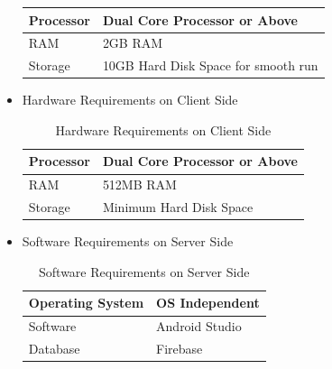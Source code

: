 \documentclass{article}
\begin{document}
\begin{flushleft}
\begin{itemize}
\begin{center}
\begin{table}[!ht]
\begin{tabular}{ | m{5em} | m{7cm} | }
            \hline
             Processor & Dual Core Processor or Above  \\ \hline
             RAM & 2GB RAM   \\  \hline
             Storage & 10GB Hard Disk Space for smooth run  \\  \hline
            \end{tabular}
            
           \end{table}
            
            \end{center}
            
            
          \item Hardware Requirements on Client Side 
          \begin{center}
          \begin{table}[!ht]
          \renewcommand\thetable{1.5.2}
              \centering
              \caption{Hardware Requirements on Client Side}
              \label{ }
             \begin{tabular}{ | m{5em} | m{7cm} | }
           
            \hline
             Processor & Dual Core Processor or Above  \\ \hline
             RAM & 512MB RAM   \\  \hline
             Storage & Minimum Hard Disk Space  \\  \hline
            \end{tabular}
              
          \end{table}
            
            \end{center}
            
            
           \item Software Requirements on Server Side
           
           
           \begin{center}
          \begin{table}[!ht]
          \renewcommand\thetable{1.5.3}
              \centering
              \caption{Software Requirements on Server Side}
              \label{"   " }
             \begin{tabular}{ | m{3cm} | m{6cm} | }
           
            \hline
             Operating System & OS Independent  \\ \hline
             Software & Android Studio   \\  \hline
             Database & Firebase   \\  \hline
            \end{tabular}
              

\end{table}
\end{center}
\end{itemize}
\end{flushleft}
\end{document}
